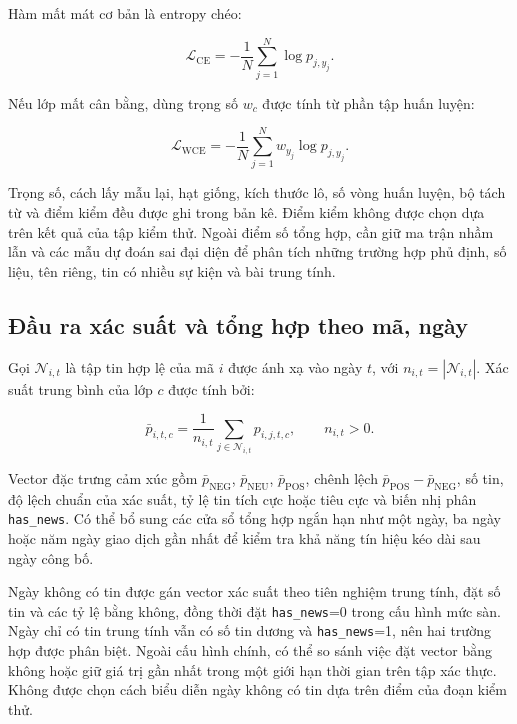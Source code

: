 Hàm mất mát cơ bản là entropy chéo:

\begin{equation}
  \mathcal{L}_{\mathrm{CE}}=-\frac{1}{N}\sum_{j=1}^{N}
  \log p_{j,y_j}.
  \label{eq:sentiment-loss}
\end{equation}

Nếu lớp mất cân bằng, dùng trọng số $w_c$ được tính từ phần tập huấn luyện:

\begin{equation}
  \mathcal{L}_{\mathrm{WCE}}=-\frac{1}{N}\sum_{j=1}^{N}
  w_{y_j}\log p_{j,y_j}.
  \label{eq:weighted-sentiment-loss}
\end{equation}

Trọng số, cách lấy mẫu lại, hạt giống, kích thước lô, số vòng huấn luyện, bộ tách từ
và điểm kiểm đều được ghi trong bản kê. Điểm kiểm không được chọn dựa trên kết quả
của tập kiểm thử. Ngoài điểm số tổng hợp, cần giữ ma trận nhầm lẫn và các mẫu dự đoán
sai đại diện để phân tích những trường hợp phủ định, số liệu, tên riêng, tin có nhiều
sự kiện và bài trung tính.

\subsection{Đầu ra xác suất và tổng hợp theo mã, ngày}

Gọi $\mathcal{N}_{i,t}$ là tập tin hợp lệ của mã $i$ được ánh xạ vào ngày $t$, với
$n_{i,t}=|\mathcal{N}_{i,t}|$. Xác suất trung bình của lớp $c$ được tính bởi:

\begin{equation}
  \bar p_{i,t,c}=\frac{1}{n_{i,t}}
  \sum_{j\in\mathcal{N}_{i,t}}p_{i,j,t,c},
  \qquad n_{i,t}>0.
  \label{eq:daily-sentiment}
\end{equation}

Vector đặc trưng cảm xúc gồm $\bar p_{\mathrm{NEG}}$, $\bar p_{\mathrm{NEU}}$,
$\bar p_{\mathrm{POS}}$, chênh lệch $\bar p_{\mathrm{POS}}-\bar p_{\mathrm{NEG}}$,
số tin, độ lệch chuẩn của xác suất, tỷ lệ tin tích cực hoặc tiêu cực và biến nhị phân
\texttt{has\_news}. Có thể bổ sung các cửa sổ tổng hợp ngắn hạn như một ngày, ba ngày
hoặc năm ngày giao dịch gần nhất để kiểm tra khả năng tín hiệu kéo dài sau ngày công bố.

Ngày không có tin được gán vector xác suất theo tiên nghiệm trung tính, đặt số tin và
các tỷ lệ bằng không, đồng thời đặt \texttt{has\_news}=0 trong cấu hình mức sàn. Ngày
chỉ có tin trung tính vẫn có số tin dương và \texttt{has\_news}=1, nên hai trường hợp
được phân biệt. Ngoài cấu hình chính, có thể so sánh việc đặt vector bằng không hoặc
giữ giá trị gần nhất trong một giới hạn thời gian trên tập xác thực. Không được chọn
cách biểu diễn ngày không có tin dựa trên điểm của đoạn kiểm thử.

